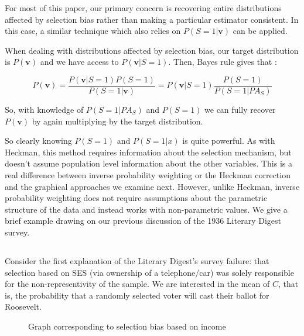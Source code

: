 \documentclass[12pt,twoside]{reedthesis}
\theoremstyle{definition}
\begin{document}
For most of this paper, our primary concern is recovering entire distributions affected by selection bias rather than making a particular estimator consistent. In this case, a similar technique which also relies on $P(S=1 | \mathbf{v})$ can be applied. 

When dealing with distributions affected by selection bias, our target distribution is $P(\mathbf{v})$ and we have access to $P(\mathbf{v} | S = 1)$. Then, Bayes rule gives that \citep{Cortes_2008}:

$$P(\mathbf{v}) = \frac{P(\mathbf{v}  | S = 1)P(S = 1)}{P(S=1 | \mathbf{v})} = P(\mathbf{v}  | S = 1) \frac{P(S = 1)}{P(S=1 | PA_{S})}$$

So, with knowledge of $P(S=1 | PA_S)$ and $P(S = 1)$ we can fully recover $P(\mathbf{v})$ by again multiplying by the target distribution. 


So clearly knowing $P(S = 1)$ and $P(S = 1|x)$ is quite powerful. As with Heckman, this method requires information about the selection mechanism, but doesn't assume population level information about the other variables. This is a real difference between inverse probability weighting or the Heckman correction and the graphical approaches we examine next. However, unlike Heckman, inverse probability weighting does not require  assumptions about the parametric structure of the data and instead works with non-parametric values.   We give a brief example drawing on our previous discussion of the 1936 Literary Digest survey.

\subsection{}

Consider the first explanation of the Literary Digest's survey failure: that selection based on SES (via ownership of a telephone/car) was solely responsible for the non-representivity of the sample. We are interested in the mean of $C$, that is, the probability that a randomly selected voter will cast their ballot for Roosevelt. 


\begin{figure}
\begin{center}
\end{center}
\caption{Graph corresponding to selection bias based on income} 
\end{figure}
\end{document}
